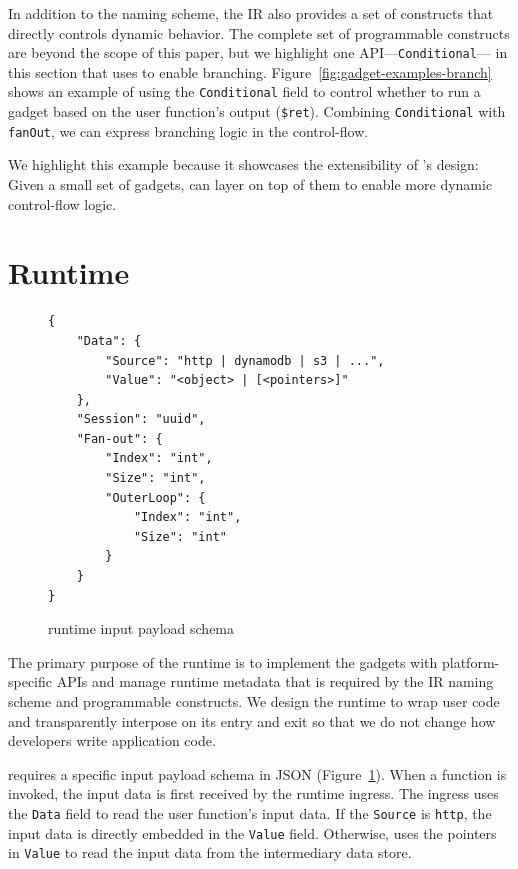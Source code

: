 In addition to the naming scheme, the IR also provides a set of constructs
that directly controls dynamic behavior. The complete set of programmable
constructs are beyond the scope of this paper, but we highlight one
API---\texttt{Conditional}--- in this section that \name{} uses to enable
branching. Figure~\ref{fig:gadget-examples-branch} shows an example of using
the \texttt{Conditional} field to control whether to run a gadget based on the
user function's output (\texttt{\$ret}). Combining \texttt{Conditional} with
\texttt{fanOut}, we can express branching logic in the control-flow. 

We highlight this example because it showcases the extensibility of \name{}'s
design: Given a small set of gadgets, \name{} can layer on top of them to
enable more dynamic control-flow logic.


\section{Runtime}

\begin{figure}[]
    \begin{verbatim}
{
    "Data": {
        "Source": "http | dynamodb | s3 | ...",
        "Value": "<object> | [<pointers>]"
    },
    "Session": "uuid",
    "Fan-out": {
        "Index": "int",
        "Size": "int",
        "OuterLoop": {
            "Index": "int",
            "Size": "int"
        }
    }
}
    \end{verbatim}
    \caption{\name{} runtime input payload schema}
    \label{fig:input-format}
\end{figure}

The primary purpose of the \name{} runtime is to implement the gadgets with
platform-specific APIs and manage runtime metadata that is required by the
\name{} IR naming scheme and programmable constructs. We design the runtime to
wrap user code and transparently interpose on its entry and exit so that we do
not change how developers write application code.

 \name{} requires a specific input payload schema in JSON
(Figure~\ref{fig:input-format}). When a function is invoked, the input data is
first received by the runtime ingress. The ingress uses the \texttt{Data}
field to read the user function's input data. If the \texttt{Source} is
\texttt{http}, the input data is directly embedded in the \texttt{Value}
field. Otherwise, \name{} uses the pointers in \texttt{Value} to read the
input data from the intermediary data store.

